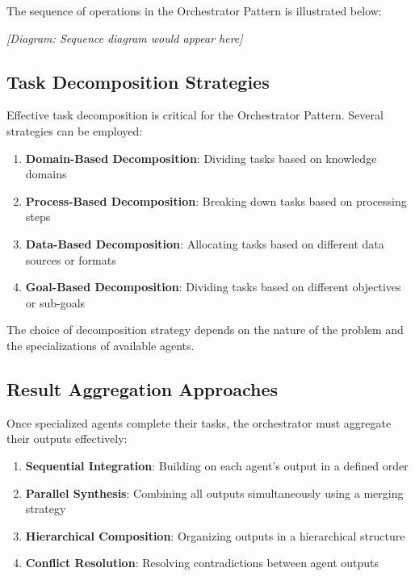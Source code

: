 \documentclass[11pt,oneside]{book}
\providecommand{\tightlist}{%
  \setlength{\itemsep}{0pt}\setlength{\parskip}{0pt}}
\begin{document}
The sequence of operations in the Orchestrator Pattern is illustrated
below:

\emph{{[}Diagram: Sequence diagram would appear here{]}}

\subsection{Task Decomposition
Strategies}\label{task-decomposition-strategies}

Effective task decomposition is critical for the Orchestrator Pattern.
Several strategies can be employed:

\begin{enumerate}
\def\labelenumi{\arabic{enumi}.}
\tightlist
\item
  \textbf{Domain-Based Decomposition}: Dividing tasks based on knowledge
  domains
\item
  \textbf{Process-Based Decomposition}: Breaking down tasks based on
  processing steps
\item
  \textbf{Data-Based Decomposition}: Allocating tasks based on different
  data sources or formats
\item
  \textbf{Goal-Based Decomposition}: Dividing tasks based on different
  objectives or sub-goals
\end{enumerate}

The choice of decomposition strategy depends on the nature of the
problem and the specializations of available agents.

\subsection{Result Aggregation
Approaches}\label{result-aggregation-approaches}

Once specialized agents complete their tasks, the orchestrator must
aggregate their outputs effectively:

\begin{enumerate}
\def\labelenumi{\arabic{enumi}.}
\tightlist
\item
  \textbf{Sequential Integration}: Building on each agent's output in a
  defined order
\item
  \textbf{Parallel Synthesis}: Combining all outputs simultaneously
  using a merging strategy
\item
  \textbf{Hierarchical Composition}: Organizing outputs in a
  hierarchical structure
\item
  \textbf{Conflict Resolution}: Resolving contradictions between agent
  outputs
\end{enumerate}
\end{document}
